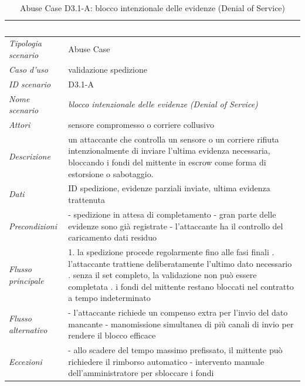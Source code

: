 \begin{longtable}{| >{\columncolor{abuseCol}}p{} | p{} |}
\caption{Abuse Case D3.1-A: blocco intenzionale delle evidenze (Denial of Service)}\label{tab:d31a}\\
\hline
\rowcolor{abuseHeader} \textcolor{white}{\textit{Campo}} & \textcolor{white}{\textit{Contenuto}} \\
\hline
\textit{Tipologia scenario} & Abuse Case \\
\hline
\textit{Caso d'uso} & validazione spedizione \\
\hline
\textit{ID scenario} & D3.1-A \\
\hline
\textit{Nome scenario} & \textit{blocco intenzionale delle evidenze (Denial of Service)} \\
\hline
\textit{Attori} & sensore compromesso o corriere collusivo \\
\hline
\textit{Descrizione} & un attaccante che controlla un sensore o un corriere rifiuta intenzionalmente di inviare l'ultima evidenza necessaria, bloccando i fondi del mittente in escrow come forma di estorsione o sabotaggio. \\
\hline
\textit{Dati} & ID spedizione, evidenze parziali inviate, ultima evidenza trattenuta \\
\hline
\textit{Precondizioni} & - spedizione in attesa di completamento \newline - gran parte delle evidenze sono già registrate \newline - l'attaccante ha il controllo del caricamento dati residuo \\
\hline
\textit{Flusso principale} & 1. la spedizione procede regolarmente fino alle fasi finali \newline 2. l'attaccante trattiene deliberatamente l'ultimo dato necessario \newline 3. senza il set completo, la validazione non può essere completata \newline 4. i fondi del mittente restano bloccati nel contratto a tempo indeterminato \\
\hline
\textit{Flusso alternativo} & - l'attaccante richiede un compenso extra per l'invio del dato mancante \newline - manomissione simultanea di più canali di invio per rendere il blocco efficace \\
\hline
\textit{Eccezioni} & - allo scadere del tempo massimo prefissato, il mittente può richiedere il rimborso automatico \newline - intervento manuale dell'amministratore per sbloccare i fondi \\

\end{longtable}

